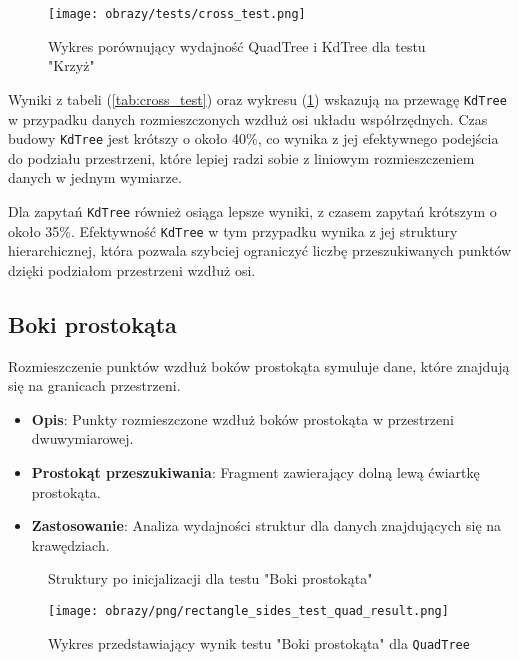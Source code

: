 \documentclass[12pt]{article}
\begin{document}
\begin{figure}[h]
    \centering
    \texttt{[image: obrazy/tests/cross\_test.png]}
    \caption{Wykres porównujący wydajność QuadTree i KdTree dla testu "Krzyż"}
    \label{fig:cross_tests}
\end{figure}

\newpage
\noindent Wyniki z tabeli (\ref{tab:cross_test}) oraz wykresu (\ref{fig:cross_tests}) wskazują na  przewagę \texttt{KdTree} w przypadku danych rozmieszczonych wzdłuż osi układu współrzędnych. Czas budowy \texttt{KdTree} jest krótszy o około 40\%, co wynika z jej efektywnego podejścia do podziału przestrzeni, które lepiej radzi sobie z liniowym rozmieszczeniem danych w jednym wymiarze.

\noindent Dla zapytań \texttt{KdTree} również osiąga lepsze wyniki, z czasem zapytań krótszym o około 35\%. Efektywność \texttt{KdTree} w tym przypadku wynika z jej struktury hierarchicznej, która pozwala szybciej ograniczyć liczbę przeszukiwanych punktów dzięki podziałom przestrzeni wzdłuż osi.


\newpage
\subsection{Boki prostokąta}
Rozmieszczenie punktów wzdłuż boków prostokąta symuluje dane, które znajdują się na granicach przestrzeni.
\begin{itemize}
    \item \textbf{Opis}: Punkty rozmieszczone wzdłuż boków prostokąta w przestrzeni dwuwymiarowej.
    \item \textbf{Prostokąt przeszukiwania}: Fragment zawierający dolną lewą ćwiartkę prostokąta.
    \item \textbf{Zastosowanie}: Analiza wydajności struktur dla danych znajdujących się na krawędziach.
\end{itemize}

\begin{figure}[h]
    \centering
    \qquad
    \caption{Struktury po inicjalizacji dla testu "Boki prostokąta"}%
    \label{fig:rectangle_sides}%
\end{figure}

\begin{figure}[h]
    \centering
    \texttt{[image: obrazy/png/rectangle\_sides\_test\_quad\_result.png]}
    \caption{Wykres przedstawiający wynik testu "Boki prostokąta" dla \texttt{QuadTree}}
    \label{fig:rectangle_sides_test_quad_result}
\end{figure}
\end{document}
